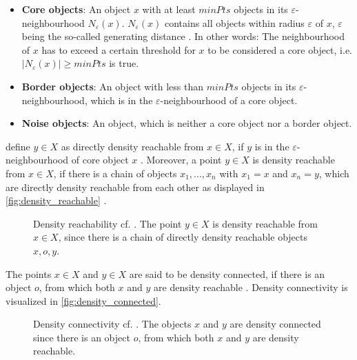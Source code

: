 \begin{itemize}
    \item \textbf{Core objects}: 
    An object $x$ with at least $minPts$ objects in its $\varepsilon$-neighbourhood $N_\varepsilon(x)$.
    $N_\varepsilon(x)$ contains all objects within radius $\varepsilon$ of $x$, $\varepsilon$ being the so-called generating distance \cite{OPTICS2013}.
    In other words: The neighbourhood of $x$ has to exceed a certain threshold for $x$ to be considered a core object, i.e. $| N_\varepsilon (x) | \geq minPts$ is true.

    \item \textbf{Border objects}: 
    An object with less than $minPts$ objects in its $\varepsilon$-neighbourhood, which is in the $\varepsilon$-neighbourhood of a core object.

    \item \textbf{Noise objects}: 
    An object, which is neither a core object nor a border object.
\end{itemize}

\citeauthor{OPTICS_kMeans_2016} define $y \in X$ as directly density reachable from $x \in X$, if $y$ is in the $\varepsilon$-neighbourhood of core object $x$ \cite{OPTICS_kMeans_2016}.
Moreover, a point $y \in X$ is density reachable from $x \in X$, if there is a chain of objects $x_1, ..., x_n$ with $x_1 = x$ and $x_n = y$, 
which are directly density reachable from each other as displayed in \autoref{fig:density_reachable} \cite{OPTICS_kMeans_2016}.

\begin{figure}[htp] %
    \centering
    
    \caption{Density reachability cf. \cite{OPTICS1999}.
    The point $y \in X$ is density reachable from $x \in X$, since there is a chain of directly density reachable objects $x, o, y$.
    }
    \label{fig:density_reachable}
\end{figure}

The points $x \in X$ and $y \in X$ are said to be density connected, if there is an object $o$, from which both $x$ and $y$ are density reachable \cite{OPTICS_kMeans_2016}.
Density connectivity is visualized in \autoref{fig:density_connected}.

\begin{figure}[htp] %
    \centering
    
    \caption{Density connectivity cf. \cite{OPTICS1999}.
    The objects $x$ and $y$ are density connected since there is an object $o$, from which both $x$ and $y$ are density reachable.
    }
    \label{fig:density_connected}
\end{figure}

